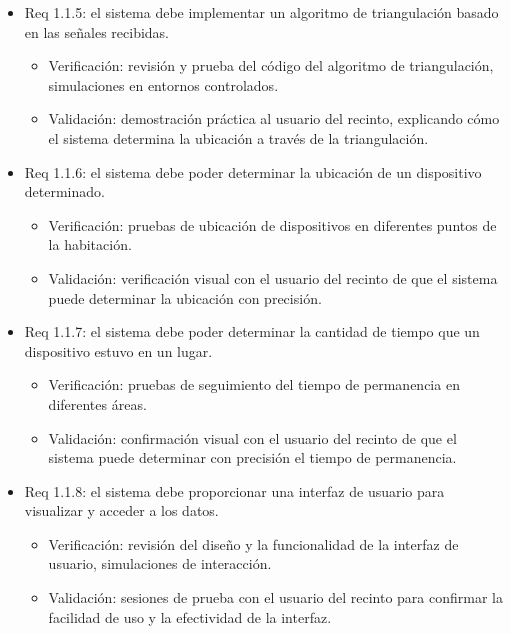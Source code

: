 \documentclass[
11pt, %
]{charter}
\begin{document}
\begin{itemize}
\item Req 1.1.5: el sistema debe implementar un algoritmo de triangulación basado en las señales recibidas.

\begin{itemize}
	\item Verificación: revisión y prueba del código del algoritmo de triangulación, simulaciones en entornos controlados.
	\item Validación: demostración práctica al usuario del recinto, explicando cómo el sistema determina la ubicación a través de la triangulación. 
\end{itemize}

\item Req 1.1.6: el sistema debe poder determinar la ubicación de un dispositivo determinado.

\begin{itemize}
	\item Verificación: pruebas de ubicación de dispositivos en diferentes puntos de la habitación.
	\item Validación: verificación visual con el usuario del recinto de que el sistema puede determinar la ubicación con precisión.
\end{itemize}

\item Req 1.1.7: el sistema debe poder determinar la cantidad de tiempo que un dispositivo estuvo en un lugar.

\begin{itemize}
	\item Verificación: pruebas de seguimiento del tiempo de permanencia en diferentes áreas.
	\item Validación: confirmación visual con el usuario del recinto de que el sistema puede determinar con precisión el tiempo de permanencia.
\end{itemize}

\item Req 1.1.8: el sistema debe proporcionar una interfaz de usuario para visualizar y acceder a los datos.

\begin{itemize}
	\item Verificación: revisión del diseño y la funcionalidad de la interfaz de usuario, simulaciones de interacción.
	\item Validación: sesiones de prueba con el usuario del recinto para confirmar la facilidad de uso y la efectividad de la interfaz.
\end{itemize}


\end{itemize}
\end{document}
